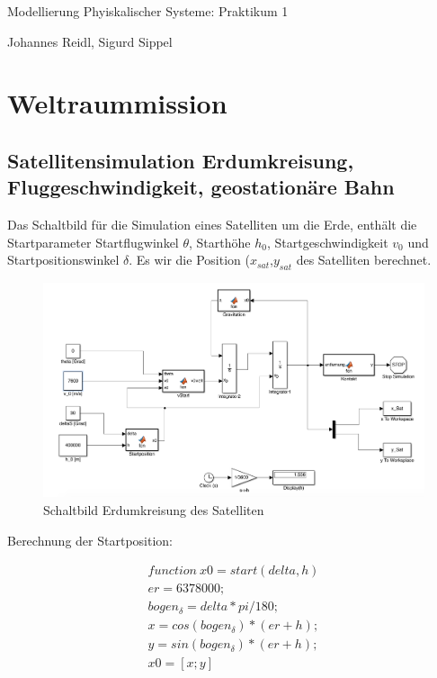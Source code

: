 \documentclass[10pt,a4paper]{article}
\begin{document}
\begin{center}
Modellierung Phyiskalischer Systeme: Praktikum 1

Johannes Reidl, Sigurd Sippel

\end{center}

\section{Weltraummission}

\subsection{Satellitensimulation Erdumkreisung, Fluggeschwindigkeit, geostationäre Bahn}

Das Schaltbild für die Simulation eines Satelliten um die Erde, enthält die Startparameter Startflugwinkel $\theta$, Starthöhe $h_0$, Startgeschwindigkeit $v_0$ und Startpositionswinkel $\delta$.  Es wir die Position ($x_{sat}$,$y_{sat}$  des Satelliten berechnet.

	\begin{figure}[H]
		\centering
		\includegraphics[width=1\textwidth]{../aufgabe1/screens/simulink.png}
		\caption{Schaltbild Erdumkreisung des Satelliten}
	\end{figure}

Berechnung der Startposition:

\begin{align}
function \: x0 = start(delta, h) 
\\er = 6378000; \nonumber %
\\bogen_\delta = delta * pi / 180;\nonumber
\\x  = cos(bogen_{\delta}) * (er + h); \nonumber
\\y  = sin(bogen_{\delta}) * (er + h);\nonumber
\\ x0 = [x ; y]\nonumber
\end{align}
\end{document}
